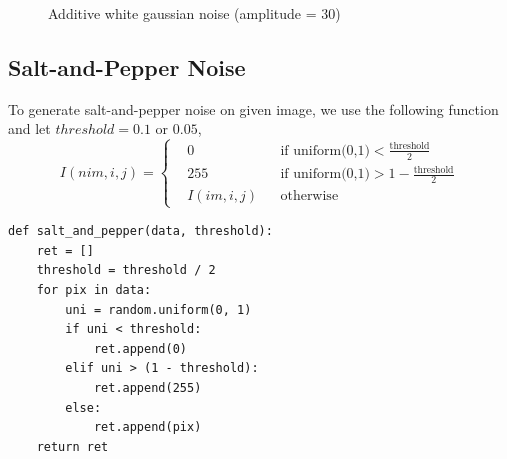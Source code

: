 \documentclass[14pt,a4paper]{extarticle}
\begin{document}
\begin{figure}[H]
\centering
	\hfill
\caption{Additive white gaussian noise (amplitude = 30)}
\end{figure}

\subsection{Salt-and-Pepper Noise}

To generate salt-and-pepper noise on given image, we use the following function and let $threshold = 0.1 \text{ or } 0.05$,
\begin{equation*}
I(nim,i,j) =
\left\{
	\begin{aligned}
	& 0        & &\text{if uniform(0,1)} < \frac{\text{threshold}}{2}\\
	& 255      & &\text{if uniform(0,1)} > 1 - \frac{\text{threshold}}{2}\\
	& I(im,i,j)& &\text{otherwise}
	\end{aligned}
\right.
\end{equation*}

\begin{lstlisting}
def salt_and_pepper(data, threshold):
	ret = []
	threshold = threshold / 2
	for pix in data:
		uni = random.uniform(0, 1)
		if uni < threshold:
			ret.append(0)
		elif uni > (1 - threshold):
			ret.append(255)
		else:
			ret.append(pix)
	return ret
\end{lstlisting}
\end{document}
